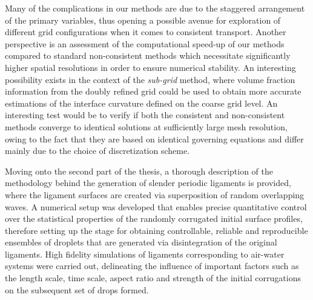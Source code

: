 Many of the complications in our methods are due to the staggered arrangement of the primary variables, 
thus opening a possible avenue for exploration of different grid configurations when it comes to consistent transport.
Another perspective is an assessment of the computational speed-up 
of our methods compared to standard non-consistent methods which necessitate 
significantly higher spatial resolutions in order to ensure numerical stability.  
An interesting possibility exists in the context of the \textit{sub-grid} method, 
where volume fraction information from the doubly refined grid could be used to
obtain more accurate estimations of the interface curvature defined on the coarse grid level. 
An interesting test would be to verify if both the consistent and non-consistent methods
converge to identical solutions at sufficiently large mesh resolution, owing to the fact that they 
are based on identical governing equations and differ mainly due to the choice of discretization scheme. 


Moving onto the second part of the thesis, a thorough description of the 
methodology behind the generation of slender periodic ligaments is provided, 
where the ligament surfaces are created via superposition of random overlapping waves.
A numerical setup was developed that enables precise quantitative control over the 
statistical properties of the randomly corrugated initial surface profiles, 
therefore setting up the stage for obtaining controllable, reliable and reproducible 
ensembles of droplets that are generated via disintegration of the original ligaments.
High fidelity simulations of ligaments corresponding to air-water systems were carried out,
delineating the influence of important factors such as the length scale, time scale, 
aspect ratio and strength of the initial corrugations on the subsequent set of drops formed.  
